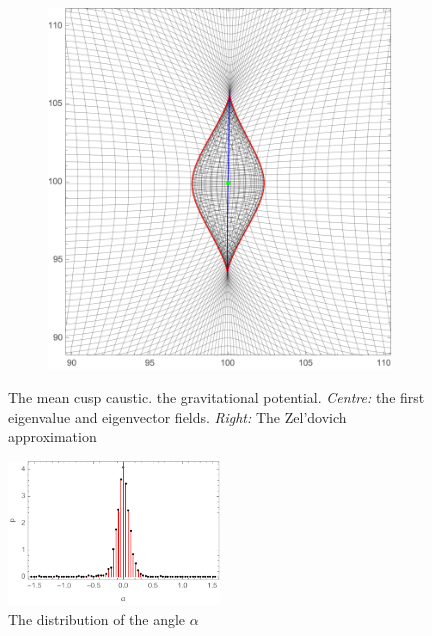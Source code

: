 \documentclass[a4paper, 11pt]{article}
\begin{document}
\begin{figure}
\begin{subfigure}[b]{0.32\textwidth}
\end{subfigure}~
\begin{subfigure}[b]{0.32\textwidth}
\includegraphics[width=\textwidth]{Cusp_mean_Z}
\end{subfigure}
\caption{The mean cusp caustic.  the gravitational potential. \textit{Centre:} the first eigenvalue and eigenvector fields. \textit{Right:} The Zel'dovich approximation}\label{fig:meanCusp}
\end{figure}

\begin{figure}
\centering
\includegraphics[width=0.5\textwidth]{alpha}
\caption{The distribution of the angle $\alpha$} 
\label{fig:alpha}
\end{figure}

\end{document}
